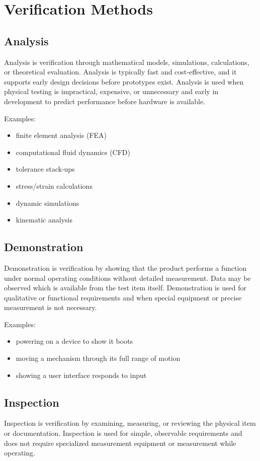 \documentclass[12pt]{article}
\begin{document}
\section{Verification Methods}

\subsection{Analysis}
Analysis is verification through mathematical models, simulations, calculations, or theoretical evaluation. 
Analysis is typically fast and cost‑effective, and it supports early design decisions before prototypes exist. 
Analysis is used when physical testing is impractical, expensive, or unnecessary and early in development to predict performance before hardware is available.

Examples: 
\begin{itemize} 
\item finite element analysis (FEA)
\item computational fluid dynamics (CFD)
\item tolerance stack‑ups
\item stress/strain calculations
\item dynamic simulations
\item kinematic analysis
\end{itemize}

\subsection{Demonstration}
Demonstration is verification by showing that the product performs a function under normal operating conditions without detailed measurement. 
Data may be observed which is available from the test item itself.
Demonstration is used for qualitative or functional requirements and when special equipment or precise measurement is not necessary.

Examples: 
\begin{itemize}
\item powering on a device to show it boots
\item moving a mechanism through its full range of motion
\item showing a user interface responds to input 
\end{itemize}

\subsection{Inspection}
Inspection is verification by examining, measuring, or reviewing the physical item or documentation. 
Inspection is used for simple, observable requirements and does not require specialized measurement equipment or measurement while operating.
\end{document}
